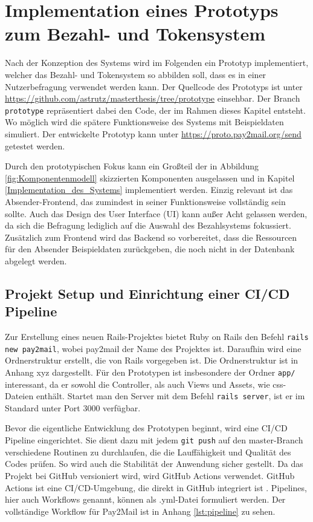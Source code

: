 
\chapter{Implementation eines Prototyps zum Bezahl- und Tokensystem}
\label{Implementation_eines_Prototyps_zum Bezahl-_und_Tokensystem}

Nach der Konzeption des Systems wird im Folgenden ein Prototyp implementiert, welcher das Bezahl- und Tokensystem so abbilden soll, dass es in einer Nutzerbefragung verwendet werden kann.  Der Quellcode des Prototyps ist unter \url{https://github.com/astrutz/masterthesis/tree/prototype} einsehbar. Der Branch \texttt{prototype} repräsentiert dabei den Code, der im Rahmen dieses Kapitel entsteht.
 Wo möglich wird die spätere Funktionsweise des Systems mit Beispieldaten simuliert. Der entwickelte Prototyp kann unter \url{https://proto.pay2mail.org/send} getestet werden. 
 
Durch den prototypischen Fokus kann ein Großteil der in Abbildung \ref{fig:Komponentenmodell} skizzierten Komponenten ausgelassen und in Kapitel \ref{Implementation_des_Systems} implementiert werden. Einzig relevant ist das Absender-Frontend, das zumindest in seiner Funktionsweise vollständig sein sollte. Auch das Design des User Interface (UI) kann außer Acht gelassen werden, da sich die Befragung lediglich auf die Auswahl des Bezahlsystems fokussiert. Zusätzlich zum Frontend wird das Backend so vorbereitet, dass die Ressourcen für den Absender Beispieldaten zurückgeben, die noch nicht in der Datenbank abgelegt werden. 

\section{Projekt Setup und Einrichtung einer CI/CD Pipeline}
\label{Projekt_Setup_und_Einrichtung_einer_CI/CD Pipeline}

Zur Erstellung eines neuen Rails-Projektes bietet Ruby on Rails den Befehl \texttt{rails new pay2mail}, wobei pay2mail der Name des Projektes ist. Daraufhin wird eine Ordnerstruktur erstellt, die von Rails vorgegeben ist. Die Ordnerstruktur ist in Anhang xyz dargestellt. Für den Prototypen ist insbesondere der Ordner \texttt{app/} interessant, da er sowohl die Controller, als auch Views und Assets, wie css-Dateien enthält. Startet man den Server mit dem Befehl \texttt{rails server}, ist er im Standard unter Port 3000 verfügbar.

Bevor die eigentliche Entwicklung des Prototypen beginnt, wird eine CI/CD Pipeline eingerichtet. Sie dient dazu mit jedem \texttt{git push} auf den master-Branch verschiedene Routinen zu durchlaufen, die die Lauffähigkeit und Qualität des Codes prüfen. So wird auch die Stabilität der Anwendung sicher gestellt. Da das Projekt bei GitHub versioniert wird, wird GitHub Actions verwendet. GitHub Actions ist eine CI/CD-Umgebung, die direkt in GitHub integriert ist \citep{GitHub2022}. Pipelines, hier auch Workflows genannt, können als .yml-Datei formuliert werden. Der vollständige Workflow für Pay2Mail ist in Anhang \ref{lst:pipeline} zu sehen.


